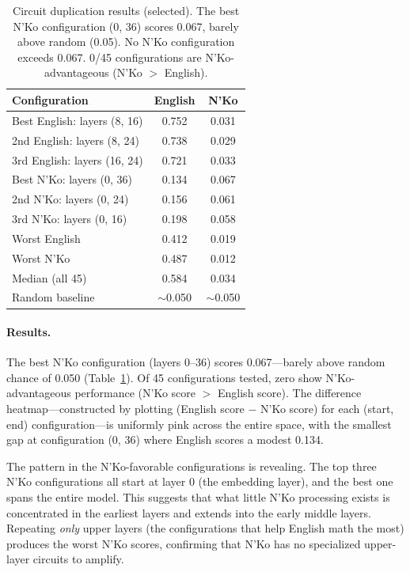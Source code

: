 \documentclass[11pt]{article}
\begin{document}
\begin{table}[t]
\centering
\small
\begin{tabular}{lcc}
\toprule
\textbf{Configuration} & \textbf{English} & \textbf{N'Ko} \\
\midrule
Best English: layers (8, 16) & 0.752 & 0.031 \\
2nd English: layers (8, 24) & 0.738 & 0.029 \\
3rd English: layers (16, 24) & 0.721 & 0.033 \\
Best N'Ko: layers (0, 36) & 0.134 & 0.067 \\
2nd N'Ko: layers (0, 24) & 0.156 & 0.061 \\
3rd N'Ko: layers (0, 16) & 0.198 & 0.058 \\
Worst English & 0.412 & 0.019 \\
Worst N'Ko & 0.487 & 0.012 \\
Median (all 45) & 0.584 & 0.034 \\
Random baseline & ${\sim}$0.050 & ${\sim}$0.050 \\
\bottomrule
\end{tabular}
\caption{Circuit duplication results (selected). The best N'Ko configuration (0, 36) scores 0.067, barely above random (0.05). No N'Ko configuration exceeds 0.067. 0/45 configurations are N'Ko-advantageous (N'Ko $>$ English).}
\label{tab:circuit-dup}
\end{table}

\paragraph{Results.}
The best N'Ko configuration (layers 0--36) scores 0.067---barely above random chance of 0.050 (Table~\ref{tab:circuit-dup}).
Of 45 configurations tested, zero show N'Ko-advantageous performance (N'Ko score $>$ English score).
The difference heatmap---constructed by plotting (English score $-$ N'Ko score) for each (start, end) configuration---is uniformly pink across the entire space, with the smallest gap at configuration (0, 36) where English scores a modest 0.134.

The pattern in the N'Ko-favorable configurations is revealing.
The top three N'Ko configurations all start at layer 0 (the embedding layer), and the best one spans the entire model.
This suggests that what little N'Ko processing exists is concentrated in the earliest layers and extends into the early middle layers.
Repeating \emph{only} upper layers (the configurations that help English math the most) produces the worst N'Ko scores, confirming that N'Ko has no specialized upper-layer circuits to amplify.
\end{document}
